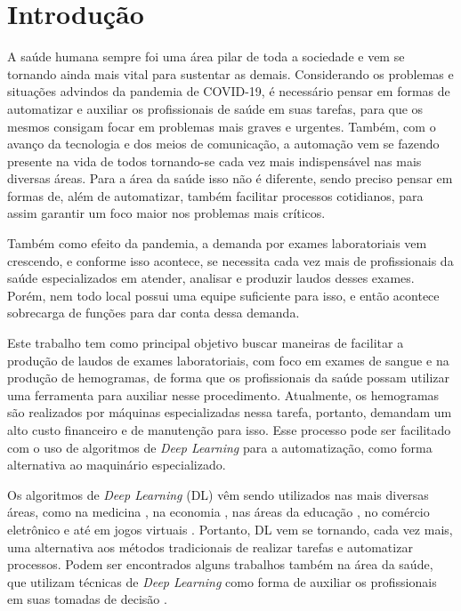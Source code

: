 \chapter{Introdução}
\label{chap:introducao}

A saúde humana sempre foi uma área pilar de toda a sociedade e vem se tornando ainda mais vital para sustentar as demais. Considerando os problemas e situações advindos da pandemia de COVID-19, é necessário pensar em formas de automatizar e auxiliar os profissionais de saúde em suas tarefas, para que os mesmos consigam focar em problemas mais graves e urgentes. Também, com o avanço da tecnologia e dos meios de comunicação, a automação vem se fazendo presente na vida de todos tornando-se cada vez mais indispensável nas mais diversas áreas. Para a área da saúde isso não é diferente, sendo preciso pensar em formas de, além de automatizar, também facilitar processos cotidianos, para assim garantir um foco maior nos problemas mais críticos.

Também como efeito da pandemia, a demanda por exames laboratoriais vem crescendo, e conforme isso acontece, se necessita cada vez mais de profissionais da saúde especializados em atender, analisar e produzir laudos desses exames. Porém, nem todo local possui uma equipe suficiente para isso, e então acontece sobrecarga de funções para dar conta dessa demanda.

Este trabalho tem como principal objetivo buscar maneiras de facilitar a produção de laudos de exames laboratoriais, com foco em exames de sangue e na produção de hemogramas, de forma que os profissionais da saúde possam utilizar uma ferramenta para auxiliar nesse procedimento. Atualmente, os hemogramas são realizados por máquinas especializadas nessa tarefa, portanto, demandam um alto custo financeiro e de manutenção para isso. Esse processo pode ser facilitado com o uso de algoritmos de \emph{Deep Learning} para a automatização, como forma alternativa ao maquinário especializado.

Os algoritmos de \emph{Deep Learning} (DL) vêm sendo utilizados nas mais diversas áreas, como na medicina \cite{deepLearningMedicine}, na economia \cite{deepLearningEconomy}, nas áreas da educação \cite{deepLearningEducation}, no comércio eletrônico \cite{deepLearningEcommerce} e até em jogos virtuais \cite{deepLearningGaming}. Portanto, DL vem se tornando, cada vez mais, uma alternativa aos métodos tradicionais de realizar tarefas e automatizar processos. Podem ser encontrados alguns trabalhos também na área da saúde, que utilizam técnicas de \emph{Deep Learning} como forma de auxiliar os profissionais em suas tomadas de decisão \cite{deepLearningHealth1, deepLearningHealth2}.

